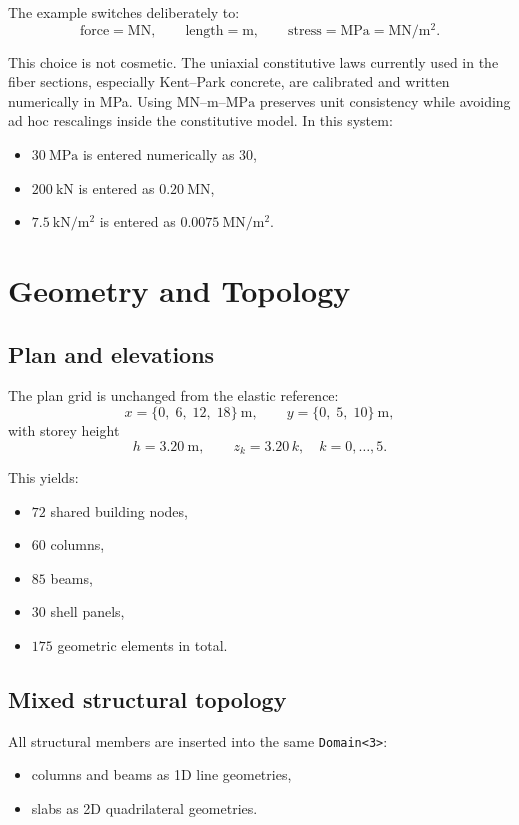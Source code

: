 The example switches deliberately to:
\[
\text{force} = \mathrm{MN},
\qquad
\text{length} = \mathrm{m},
\qquad
\text{stress} = \mathrm{MPa} = \mathrm{MN/m^2}.
\]

This choice is not cosmetic.  The uniaxial constitutive laws currently used in
the fiber sections, especially Kent--Park concrete, are calibrated and written
numerically in MPa.  Using \(\mathrm{MN}\)--\(\mathrm{m}\)--\(\mathrm{MPa}\)
preserves unit consistency while avoiding ad hoc rescalings inside the
constitutive model.  In this system:
\begin{itemize}
  \item \(30\ \mathrm{MPa}\) is entered numerically as \(30\),
  \item \(200\ \mathrm{kN}\) is entered as \(0.20\ \mathrm{MN}\),
  \item \(7.5\ \mathrm{kN/m^2}\) is entered as \(0.0075\ \mathrm{MN/m^2}\).
\end{itemize}

\section{Geometry and Topology}

\subsection{Plan and elevations}

The plan grid is unchanged from the elastic reference:
\[
x = \{0,\; 6,\; 12,\; 18\}\ \mathrm{m},
\qquad
y = \{0,\; 5,\; 10\}\ \mathrm{m},
\]
with storey height
\[
h = 3.20\ \mathrm{m},
\qquad
z_k = 3.20\,k,\quad k=0,\dots,5.
\]

This yields:
\begin{itemize}
  \item \(72\) shared building nodes,
  \item \(60\) columns,
  \item \(85\) beams,
  \item \(30\) shell panels,
  \item \(175\) geometric elements in total.
\end{itemize}

\subsection{Mixed structural topology}

All structural members are inserted into the same \texttt{Domain<3>}:
\begin{itemize}
  \item columns and beams as 1D line geometries,
  \item slabs as 2D quadrilateral geometries.
\end{itemize}

